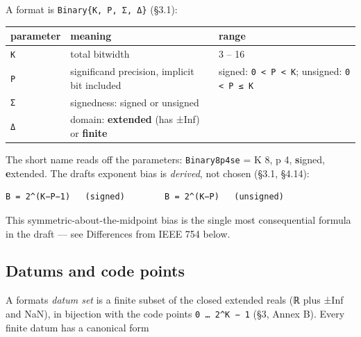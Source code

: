 \label{12063105756466521911}{}


A format is \texttt{Binary\{K, P, Σ, Δ\}} (§3.1):




\begin{table}[h]
\centering
\begin{tabulary}{\linewidth}{L L L}
\toprule
parameter & meaning & range \\
\toprule
\texttt{K} & total bitwidth & 3 – 16 \\
\texttt{P} & significand precision, implicit bit included & signed: \texttt{0 < P < K}; unsigned: \texttt{0 < P ≤ K} \\
\texttt{Σ} & signedness: signed or unsigned &  \\
\texttt{Δ} & domain: \textbf{extended} (has ±Inf) or \textbf{finite} &  \\
\bottomrule
\end{tabulary}

\end{table}



The short name reads off the parameters: \texttt{Binary8p4se} = K 8, p 4, \textbf{s}igned, \textbf{e}xtended. The draft{\textquotesingle}s exponent bias is \emph{derived}, not chosen (§3.1, §4.14):




\nopagebreak[4]
\begin{verbatim}
B = 2^(K−P−1)   (signed)        B = 2^(K−P)   (unsigned)
\end{verbatim}



This symmetric-about-the-midpoint bias is the single most consequential formula in the draft — see {\textquotedbl}Differences from IEEE 754{\textquotedbl} below.



\subsection{Datums and code points}



\label{15176353406766861258}{}


A format{\textquotesingle}s \emph{datum set} is a finite subset of the closed extended reals (ℝ plus ±Inf and NaN), in bijection with the code points \texttt{0 … 2{\textasciicircum}K − 1} (§3, Annex B). Every finite datum has a canonical form




